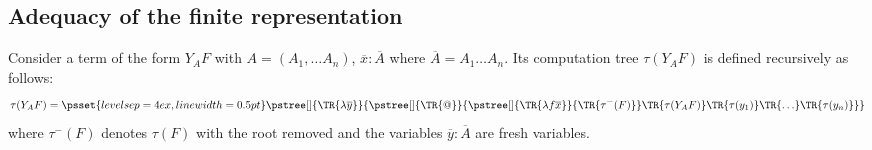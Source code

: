 \documentclass{article}
\newcommand{\tree}[2][]{\pstree[#1]{\TR{#2}}}
\newcommand{\pssetcomptree}{\psset{levelsep=4ex,linewidth=0.5pt}}
\begin{document}
%
%
%
%
%
%
%

\subsection{Adequacy of the finite representation}

Consider a term of the form $Y_A F$ with $A = (A_1, \ldots A_n)$, $\overline{x} : \overline{A}$ where $\overline{A} = A_1 \ldots A_n$. Its computation tree $\tau(Y_A F)$ is defined recursively as follows:
$$\tau(Y_A F) = \pssetcomptree\tree{ \lambda \overline{y}}
     {  \tree{@}
               { \tree{ \lambda f \overline{x}}{\TR{\tau^-(F)}}
            \TR{\tau(Y_A F)}
            \TR{\tau(y_1)}
            \TR{\ldots}
            \TR{\tau(y_n)}
                }
    }
$$
where $\tau^-(F)$ denotes $\tau(F)$ with the root removed and the variables $\overline{y}:\overline{A}$ are fresh variables.
\end{document}
